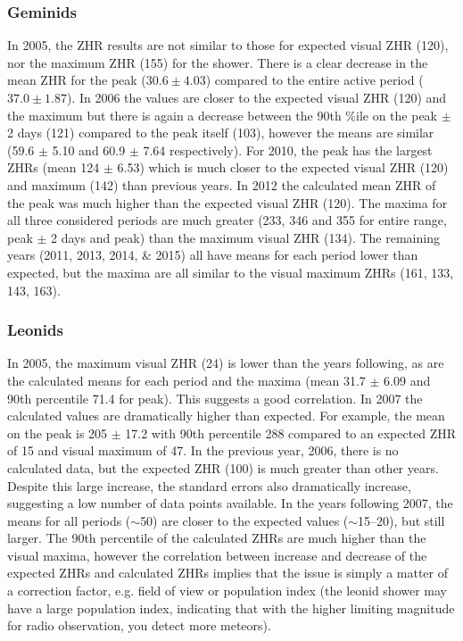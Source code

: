 \subsubsection{Geminids}
In 2005, the ZHR results are not similar to those for expected visual ZHR (120), nor the maximum ZHR (155) for the shower. There is a clear decrease in the mean ZHR for the peak ($30.6 \pm 4.03$) compared to the entire active period ($37.0 \pm 1.87$). 
In 2006 the values are closer to the expected visual ZHR (120) and the maximum but there is again a decrease between the 90th \%ile on the peak $\pm$ 2 days (121) compared to the peak itself (103), however the means are similar (59.6 $\pm$ 5.10 and 60.9 $\pm$ 7.64 respectively).
For 2010, the peak has the largest ZHRs (mean 124 $\pm$ 6.53) which is much closer to the expected visual ZHR (120) and maximum (142) than previous years.
In 2012 the calculated mean ZHR of the peak was much higher than the expected visual ZHR (120). The maxima for all three considered periods are much greater (233, 346 and 355 for entire range, peak $\pm$ 2 days and peak) than the maximum visual ZHR (134). 
The remaining years (2011, 2013, 2014, \& 2015) all have means for each period lower than expected, but the maxima are all similar to the visual maximum ZHRs (161, 133, 143, 163).

\subsubsection{Leonids}
In 2005, the maximum visual ZHR (24) is lower than the years following, as are the calculated means for each period and the maxima (mean 31.7 $\pm$ 6.09 and 90th percentile 71.4 for peak). This suggests a good correlation. 
In 2007 the calculated values are dramatically higher than expected. For example, the mean on the peak is 205 $\pm$ 17.2 with 90th percentile 288 compared to an expected ZHR of 15 and visual maximum of 47. In the previous year, 2006, there is no calculated data, but the expected ZHR (100) is much greater than other years. Despite this large increase, the standard errors also dramatically increase, suggesting a low number of data points available. 
In the years following 2007, the means for all periods ($\sim$50) are closer to the expected values ($\sim$15--20), but still larger. The 90th percentile of the calculated ZHRs are much higher than the visual maxima, however the correlation between increase and decrease of the expected ZHRs and calculated ZHRs implies that the issue is simply a matter of a correction factor, e.g. field of view or population index (the leonid shower may have a large population index, indicating that with the higher limiting magnitude for radio observation, you detect more meteors).

